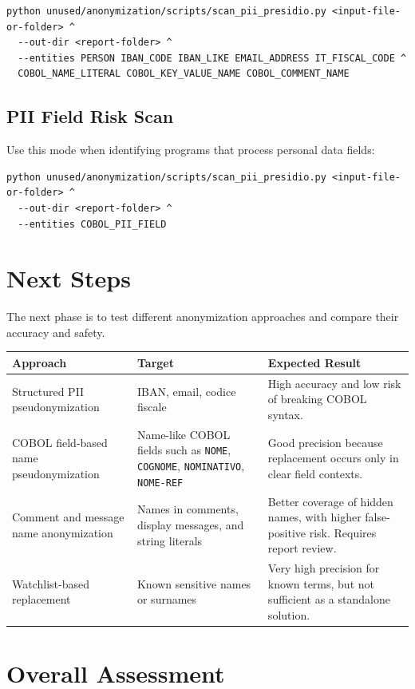 ﻿\documentclass[11pt,a4paper]{article}
\newcommand{\code}[1]{\texttt{#1}}
\begin{document}
\begin{verbatim}
python unused/anonymization/scripts/scan_pii_presidio.py <input-file-or-folder> ^
  --out-dir <report-folder> ^
  --entities PERSON IBAN_CODE IBAN_LIKE EMAIL_ADDRESS IT_FISCAL_CODE ^
  COBOL_NAME_LITERAL COBOL_KEY_VALUE_NAME COBOL_COMMENT_NAME
\end{verbatim}

\subsection{PII Field Risk Scan}

Use this mode when identifying programs that process personal data fields:

\begin{verbatim}
python unused/anonymization/scripts/scan_pii_presidio.py <input-file-or-folder> ^
  --out-dir <report-folder> ^
  --entities COBOL_PII_FIELD
\end{verbatim}

\section{Next Steps}

The next phase is to test different anonymization approaches and compare their accuracy and safety.

\begin{longtable}{p{}p{}p{}}
\textbf{Approach} & \textbf{Target} & \textbf{Expected Result} \\
\hline
Structured PII pseudonymization & IBAN, email, codice fiscale & High accuracy and low risk of breaking COBOL syntax. \\
COBOL field-based name pseudonymization & Name-like COBOL fields such as \code{NOME}, \code{COGNOME}, \code{NOMINATIVO}, \code{NOME-REF} & Good precision because replacement occurs only in clear field contexts. \\
Comment and message name anonymization & Names in comments, display messages, and string literals & Better coverage of hidden names, with higher false-positive risk. Requires report review. \\
Watchlist-based replacement & Known sensitive names or surnames & Very high precision for known terms, but not sufficient as a standalone solution. \\
\end{longtable}

\section{Overall Assessment}
\end{document}
